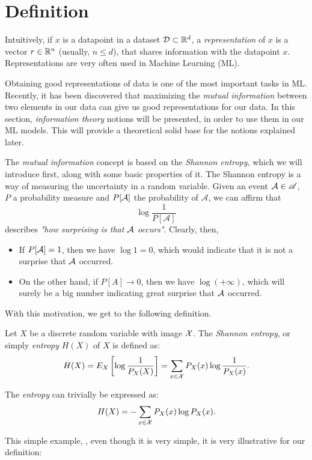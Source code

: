 \section{Definition}
Intuitively, if $x$ is a datapoint in a dataset $\mathcal{D} \subset \mathbb{R}^d$, a \emph{representation} of $x$ is a vector $r \in \mathbb{R}^n$ (usually, $n \leq d$), that shares information with the datapoint $x$. Representations are very often used in Machine Learning (ML).

Obtaining good representations of data is one of the most important tasks in ML. 
Recently, it has been discovered that maximizing the \emph{mutual information} between two elements in our data can give us good representations for our data.
In this section, \emph{information theory} notions will be presented, in order to use them in our ML models. This will provide a theoretical solid base for
the notions explained later.


The \emph{mutual information} concept is based on the \emph{Shannon entropy}, which we will introduce first, along with some basic properties of it. The Shannon entropy is a way of measuring the uncertainty in a random variable. 
Given an event $\mathcal A \in \mathscr{A}$, $P$ a probability measure and $P[\mathcal A]$ the probability of $\mathcal A$, we can affirm that 
$$
\log\frac{1}{P[\mathcal A]}
$$
describes \emph{"how surprising is that $\mathcal A$ occurs"}. Clearly, then, 
\begin{itemize}
\item If $P[\mathcal A]= 1$, then we have $\log 1 = 0$, which would indicate that it is not a surprise that $\mathcal A$ occurred.

\item On the other hand, if $P[A]\to 0$, then we have $\log(+\infty)$, which will surely be a big number indicating great surprise that $\mathcal A$ occurred.
\end{itemize}

With this motivation, we get to the following definition.
\begin{ndef}
Let $X$ be a discrete random variable with image $\mathcal{X}$. The \emph{Shannon entropy}, or simply \emph{entropy}  $H(X)$ of $X$ is defined as:
$$
H(X) = E_X\left[\log\frac{1}{P_X(X)}\right] =  \sum_{x \in \mathcal{X}} P_X(x) \log\frac{1}{P_X(x)}.
$$
\end{ndef}
The \emph{entropy} can trivially be expressed as:
$$
H(X) = - \sum_{x \in \mathcal{X}}P_X (x)\log P_X(x).
$$

This simple example, \citep{cover_elements_1991}, even though it is very simple, it is very illustrative for our definition:

